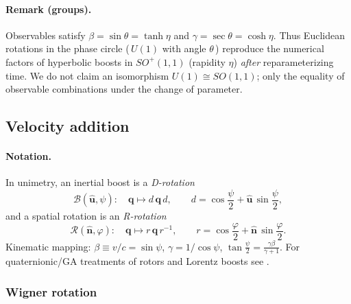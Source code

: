 \documentclass[11pt]{article}
\numberwithin{equation}{section}
\providecommand{\uhat}{\hat{\mathbf u}}
\begin{document}
\paragraph{Remark (groups).} Observables satisfy $\beta=\sin\theta=\tanh\eta$ and $\gamma=\sec\theta=\cosh\eta$. Thus Euclidean rotations in the phase circle (\,$U(1)$ with angle $\theta$\,) reproduce the numerical factors of hyperbolic boosts in $SO^+(1,1)$ (rapidity $\eta$) \emph{after} reparameterizing time. We do not claim an isomorphism $U(1)\cong SO(1,1)$; only the equality of observable combinations under the change of parameter.


\subsection{Velocity addition}
\label{sec:vel-addition}

\paragraph{Notation.}
In unimetry, an inertial boost is a \emph{D-rotation}
\begin{equation}
\mathcal{B}(\uhat,\psi):\quad \mathbf q \mapsto d\,\mathbf q\,d,
\qquad
d=\cos\frac{\psi}{2}+\uhat\,\sin\frac{\psi}{2},
\end{equation}
and a spatial rotation is an \emph{R-rotation}
\begin{equation}
\mathcal{R}(\hat{\mathbf n},\varphi):\quad \mathbf q \mapsto r\,\mathbf q\,r^{-1},
\qquad
r=\cos\frac{\varphi}{2}+\hat{\mathbf n}\,\sin\frac{\varphi}{2}.
\end{equation}
Kinematic mapping: $\beta\equiv v/c=\sin\psi$, $\gamma=1/\cos\psi$,
$\displaystyle \tan\frac{\psi}{2}=\frac{\gamma\beta}{\gamma+1}$.
For quaternionic/GA treatments of rotors and Lorentz boosts see \cite{Hamilton1844,HestenesSobczyk1984,DoranLasenby2003}.

\subsubsection{Wigner rotation}
\label{subsec:wigner}
\end{document}
